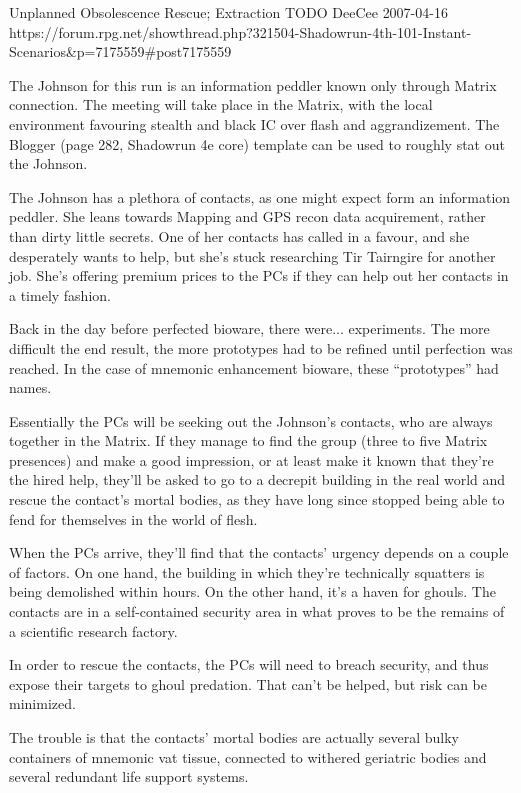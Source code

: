 \begin{scenario}{Unplanned Obsolescence}
	{Rescue; Extraction}
	{TODO}
	{DeeCee}
	{2007-04-16}
	{https://forum.rpg.net/showthread.php?321504-Shadowrun-4th-101-Instant-Scenarios\&p=7175559#post7175559}

  The Johnson for this run is an information peddler known only through Matrix connection. The meeting will take place in the Matrix, with the local environment favouring stealth and black IC over flash and aggrandizement. The Blogger (page 282, Shadowrun 4e core) template can be used to roughly stat out the Johnson.

\synopsis The Johnson has a plethora of contacts, as one might expect form an information peddler. She leans towards Mapping and GPS recon data acquirement, rather than dirty little secrets. One of her contacts has called in a favour, and she desperately wants to help, but she's stuck researching Tir Tairngire for another job. She's offering premium prices to the PCs if they can help out her contacts in a timely fashion.

Back in the day before perfected bioware, there were... experiments. The more difficult the end result, the more prototypes had to be refined until perfection was reached. In the case of mnemonic enhancement bioware, these ``prototypes'' had names.

Essentially the PCs will be seeking out the Johnson's contacts, who are always together in the Matrix. If they manage to find the group (three to five Matrix presences) and make a good impression, or at least make it known that they're the hired help, they'll be asked to go to a decrepit building in the real world and rescue the contact's mortal bodies, as they have long since stopped being able to fend for themselves in the world of flesh.

When the PCs arrive, they'll find that the contacts' urgency depends on a couple of factors. On one hand, the building in which they're technically squatters is being demolished within hours. On the other hand, it's a haven for ghouls. The contacts are in a self-contained security area in what proves to be the remains of a scientific research factory.

In order to rescue the contacts, the PCs will need to breach security, and thus expose their targets to ghoul predation. That can't be helped, but risk can be minimized.

The trouble is that the contacts' mortal bodies are actually several bulky containers of mnemonic vat tissue, connected to withered geriatric bodies and several redundant life support systems.


\end{scenario}

